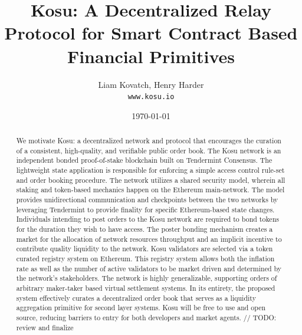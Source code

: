 \documentclass[10pt]{article}
\begin{document}

\title{\textbf{Kosu: A Decentralized Relay Protocol for Smart Contract Based Financial Primitives}} 
\author{Liam Kovatch, Henry Harder \\\texttt{www.kosu.io}}
\date{\today}
\maketitle


\begin{abstract}
   We motivate Kosu: a decentralized network and protocol that encourages the curation of a consistent, high-quality, and verifiable public order book. The Kosu network is an independent bonded proof-of-stake blockchain built on Tendermint Consensus. The lightweight state application is responsible for enforcing a simple access control rule-set and order booking procedure. The network utilizes a shared security model, wherein all staking and token-based mechanics happen on the Ethereum main-network. The model provides unidirectional communication and checkpoints between the two networks by leveraging Tendermint to provide finality for specific Ethereum-based state changes. Individuals intending to post orders to the Kosu network are required to bond tokens for the duration they wish to have access. The poster bonding mechanism creates a market for the allocation of network resources throughput and an implicit incentive to contribute quality liquidity to the network. Kosu validators are selected via a token curated registry system on Ethereum. This registry system allows both the inflation rate as well as the number of active validators to be market driven and determined by the network’s stakeholders. The network is highly generalizable, supporting orders of arbitrary maker-taker based virtual settlement systems. In its entirety, the proposed system effectively curates a decentralized order book that serves as a liquidity aggregation primitive for second layer systems. Kosu will be free to use and open source, reducing barriers to entry for both developers and market agents. // TODO: review and finalize
   \medskip
\end{abstract}
\pagebreak
\end{document}
